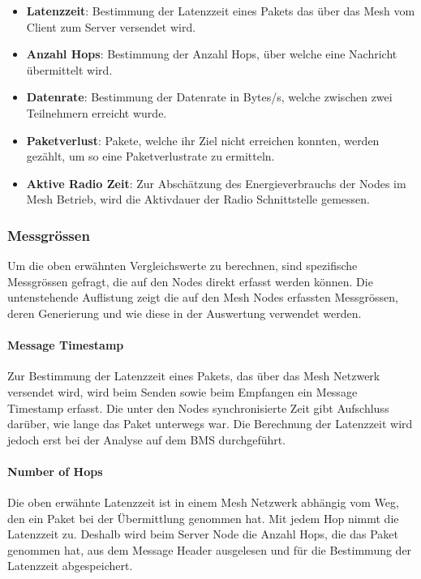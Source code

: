 \begin{itemize}
	\item \textbf{Latenzzeit}: Bestimmung der Latenzzeit eines Pakets das über das Mesh vom Client zum Server versendet wird.  
	\item \textbf{Anzahl Hops}: Bestimmung der Anzahl Hops, über welche eine Nachricht übermittelt wird.
	\item \textbf{Datenrate}: Bestimmung der Datenrate in Bytes/s, welche zwischen zwei Teilnehmern erreicht wurde. 
	\item \textbf{Paketverlust}: Pakete, welche ihr Ziel nicht erreichen konnten, werden gezählt, um so eine Paketverlustrate zu ermitteln.
	\item \textbf{Aktive Radio Zeit}: Zur Abschätzung des Energieverbrauchs der Nodes im Mesh Betrieb, wird die Aktivdauer der Radio Schnittstelle gemessen.
\end{itemize}


\subsubsection{Messgrössen}\label{subsubsec:Messgrössen}
Um die oben erwähnten Vergleichswerte zu berechnen, sind spezifische Messgrössen gefragt, die auf den Nodes direkt erfasst werden können.
Die untenstehende Auflistung zeigt die auf den Mesh Nodes erfassten Messgrössen, deren Generierung und wie diese in der Auswertung verwendet werden.


\paragraph{Message Timestamp}
Zur Bestimmung der Latenzzeit eines Pakets, das über das Mesh Netzwerk versendet wird, wird beim Senden sowie beim Empfangen ein Message Timestamp erfasst.
Die unter den Nodes synchronisierte Zeit gibt Aufschluss darüber, wie lange das Paket unterwegs war. Die Berechnung der Latenzzeit wird jedoch erst bei der Analyse auf dem BMS durchgeführt.

\paragraph{Number of Hops}
Die oben erwähnte Latenzzeit ist in einem Mesh Netzwerk abhängig vom Weg, den ein Paket bei der Übermittlung genommen hat. Mit jedem Hop nimmt die Latenzzeit zu.
Deshalb wird beim Server Node die Anzahl Hops, die das Paket genommen hat, aus dem Message Header ausgelesen und für die Bestimmung der Latenzzeit abgespeichert.

